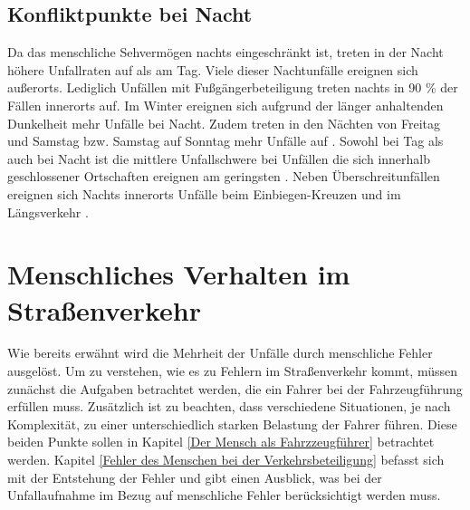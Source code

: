 \subsection{Konfliktpunkte bei Nacht}
Da das menschliche Sehvermögen nachts eingeschränkt ist, treten in der Nacht höhere Unfallraten auf als am Tag. Viele dieser Nachtunfälle ereignen sich außerorts. Lediglich Unfällen mit Fußgängerbeteiligung treten nachts in 90 \% der Fällen innerorts auf. Im Winter ereignen sich aufgrund der länger anhaltenden Dunkelheit mehr Unfälle bei Nacht. Zudem treten in den Nächten von Freitag und Samstag bzw. Samstag auf Sonntag mehr Unfälle auf  \parencite[S. 12]{DEKRA.2017}. Sowohl bei Tag als auch bei Nacht ist die mittlere Unfallschwere bei Unfällen die sich innerhalb geschlossener Ortschaften ereignen am geringsten \parencite[S. 18]{DEKRA.2017}. Neben Überschreitunfällen ereignen sich Nachts innerorts Unfälle beim Einbiegen-Kreuzen und im Längsverkehr \parencite[S. 26]{DEKRA.2017}.


\section{Menschliches Verhalten im Straßenverkehr}
Wie bereits erwähnt wird die Mehrheit der Unfälle durch menschliche Fehler ausgelöst. Um zu verstehen, wie es zu Fehlern im Straßenverkehr kommt, müssen zunächst die Aufgaben betrachtet werden, die ein Fahrer bei der Fahrzeugführung erfüllen muss. Zusätzlich ist zu beachten, dass verschiedene Situationen, je nach Komplexität, zu einer unterschiedlich starken Belastung der Fahrer führen. Diese beiden Punkte sollen in Kapitel \ref{Der Mensch als Fahrzzeugführer} betrachtet werden. Kapitel \ref{Fehler des Menschen bei der Verkehrsbeteiligung} befasst sich mit der Entstehung der Fehler und gibt einen Ausblick, was bei der Unfallaufnahme im Bezug auf menschliche Fehler berücksichtigt werden muss.

